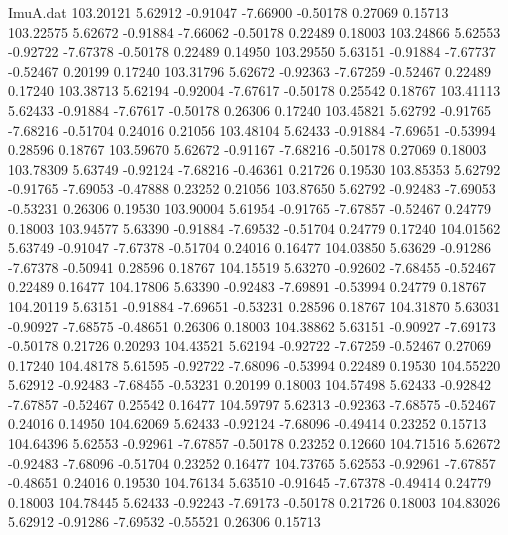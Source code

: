 \begin{filecontents}{ImuA.dat}
 103.20121    5.62912   -0.91047   -7.66900   -0.50178    0.27069    0.15713
 103.22575    5.62672   -0.91884   -7.66062   -0.50178    0.22489    0.18003
 103.24866    5.62553   -0.92722   -7.67378   -0.50178    0.22489    0.14950
 103.29550    5.63151   -0.91884   -7.67737   -0.52467    0.20199    0.17240
 103.31796    5.62672   -0.92363   -7.67259   -0.52467    0.22489    0.17240
 103.38713    5.62194   -0.92004   -7.67617   -0.50178    0.25542    0.18767
 103.41113    5.62433   -0.91884   -7.67617   -0.50178    0.26306    0.17240
 103.45821    5.62792   -0.91765   -7.68216   -0.51704    0.24016    0.21056
 103.48104    5.62433   -0.91884   -7.69651   -0.53994    0.28596    0.18767
 103.59670    5.62672   -0.91167   -7.68216   -0.50178    0.27069    0.18003
 103.78309    5.63749   -0.92124   -7.68216   -0.46361    0.21726    0.19530
 103.85353    5.62792   -0.91765   -7.69053   -0.47888    0.23252    0.21056
 103.87650    5.62792   -0.92483   -7.69053   -0.53231    0.26306    0.19530
 103.90004    5.61954   -0.91765   -7.67857   -0.52467    0.24779    0.18003
 103.94577    5.63390   -0.91884   -7.69532   -0.51704    0.24779    0.17240
 104.01562    5.63749   -0.91047   -7.67378   -0.51704    0.24016    0.16477
 104.03850    5.63629   -0.91286   -7.67378   -0.50941    0.28596    0.18767
 104.15519    5.63270   -0.92602   -7.68455   -0.52467    0.22489    0.16477
 104.17806    5.63390   -0.92483   -7.69891   -0.53994    0.24779    0.18767
 104.20119    5.63151   -0.91884   -7.69651   -0.53231    0.28596    0.18767
 104.31870    5.63031   -0.90927   -7.68575   -0.48651    0.26306    0.18003
 104.38862    5.63151   -0.90927   -7.69173   -0.50178    0.21726    0.20293
 104.43521    5.62194   -0.92722   -7.67259   -0.52467    0.27069    0.17240
 104.48178    5.61595   -0.92722   -7.68096   -0.53994    0.22489    0.19530
 104.55220    5.62912   -0.92483   -7.68455   -0.53231    0.20199    0.18003
 104.57498    5.62433   -0.92842   -7.67857   -0.52467    0.25542    0.16477
 104.59797    5.62313   -0.92363   -7.68575   -0.52467    0.24016    0.14950
 104.62069    5.62433   -0.92124   -7.68096   -0.49414    0.23252    0.15713
 104.64396    5.62553   -0.92961   -7.67857   -0.50178    0.23252    0.12660
 104.71516    5.62672   -0.92483   -7.68096   -0.51704    0.23252    0.16477
 104.73765    5.62553   -0.92961   -7.67857   -0.48651    0.24016    0.19530
 104.76134    5.63510   -0.91645   -7.67378   -0.49414    0.24779    0.18003
 104.78445    5.62433   -0.92243   -7.69173   -0.50178    0.21726    0.18003
 104.83026    5.62912   -0.91286   -7.69532   -0.55521    0.26306    0.15713

\end{filecontents}
